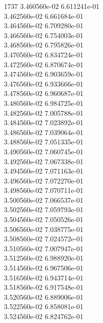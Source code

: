 1737	3.460560e-02	6.611241e-01	\\ 	3.462560e-02	6.661684e-01	\\ 	3.464560e-02	6.709280e-01	\\ 	3.466560e-02	6.754003e-01	\\ 	3.468560e-02	6.795826e-01	\\ 	3.470560e-02	6.834724e-01	\\ 	3.472560e-02	6.870674e-01	\\ 	3.474560e-02	6.903659e-01	\\ 	3.476560e-02	6.933666e-01	\\ 	3.478560e-02	6.960687e-01	\\ 	3.480560e-02	6.984725e-01	\\ 	3.482560e-02	7.005788e-01	\\ 	3.484560e-02	7.023892e-01	\\ 	3.486560e-02	7.039064e-01	\\ 	3.488560e-02	7.051335e-01	\\ 	3.490560e-02	7.060745e-01	\\ 	3.492560e-02	7.067338e-01	\\ 	3.494560e-02	7.071163e-01	\\ 	3.496560e-02	7.072270e-01	\\ 	3.498560e-02	7.070711e-01	\\ 	3.500560e-02	7.066537e-01	\\ 	3.502560e-02	7.059793e-01	\\ 	3.504560e-02	7.050526e-01	\\ 	3.506560e-02	7.038775e-01	\\ 	3.508560e-02	7.024572e-01	\\ 	3.510560e-02	7.007947e-01	\\ 	3.512560e-02	6.988920e-01	\\ 	3.514560e-02	6.967506e-01	\\ 	3.516560e-02	6.943714e-01	\\ 	3.518560e-02	6.917548e-01	\\ 	3.520560e-02	6.889006e-01	\\ 	3.522560e-02	6.858081e-01	\\ 	3.524560e-02	6.824762e-01	\\ \hline
